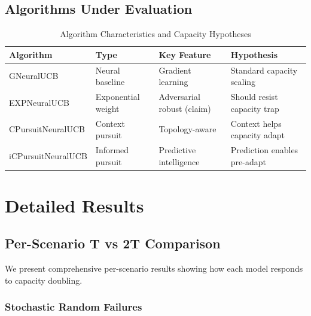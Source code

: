 \subsection{Algorithms Under Evaluation}

\vspace{-0.2cm}
\begin{table}[h]
\scriptsize
\centering
\begin{tabular}{llll}
\toprule
\textbf{Algorithm} & \textbf{Type} & \textbf{Key Feature} & \textbf{Hypothesis} \\
\midrule
GNeuralUCB & Neural baseline & Gradient learning & Standard capacity scaling \\
EXPNeuralUCB & Exponential weight & Adversarial robust (claim) & Should resist capacity trap \\
CPursuitNeuralUCB & Context pursuit & Topology-aware & Context helps capacity adapt \\
iCPursuitNeuralUCB & Informed pursuit & Predictive intelligence & Prediction enables pre-adapt \\
\bottomrule
\end{tabular}
\vspace{-0.2cm}
\caption{Algorithm Characteristics and Capacity Hypotheses}
\end{table}


\section{Detailed Results}

\subsection{Per-Scenario T vs 2T Comparison}

We present comprehensive per-scenario results showing how each model responds to capacity doubling.

\subsubsection{Stochastic Random Failures}

